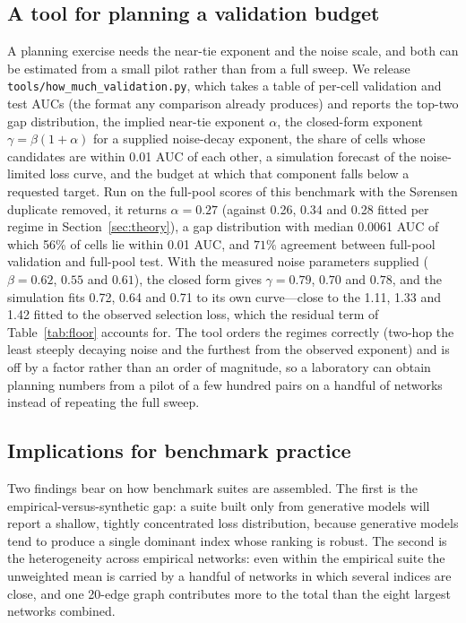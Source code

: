 \documentclass{comjnl}
\begin{document}
\subsection{A tool for planning a validation budget}
\label{sec:tool}

A planning exercise needs the near-tie exponent and the noise scale, and both can be estimated from a small pilot rather than from a full sweep. We release \texttt{tools/how\_much\_validation.py}, which takes a table of per-cell validation and test AUCs (the format any comparison already produces) and reports the top-two gap distribution, the implied near-tie exponent $\alpha$, the closed-form exponent $\gamma=\beta(1+\alpha)$ for a supplied noise-decay exponent, the share of cells whose candidates are within 0.01 AUC of each other, a simulation forecast of the noise-limited loss curve, and the budget at which that component falls below a requested target. Run on the full-pool scores of this benchmark with the S{\o}rensen duplicate removed, it returns $\alpha=0.27$ (against 0.26, 0.34 and 0.28 fitted per regime in Section~\ref{sec:theory}), a gap distribution with median 0.0061 AUC of which 56\% of cells lie within 0.01 AUC, and $71\%$ agreement between full-pool validation and full-pool test. With the measured noise parameters supplied ($\beta=0.62$, $0.55$ and $0.61$), the closed form gives $\gamma=0.79$, $0.70$ and $0.78$, and the simulation fits 0.72, 0.64 and 0.71 to its own curve---close to the 1.11, 1.33 and 1.42 fitted to the observed selection loss, which the residual term of Table~\ref{tab:floor} accounts for. The tool orders the regimes correctly (two-hop the least steeply decaying noise and the furthest from the observed exponent) and is off by a factor rather than an order of magnitude, so a laboratory can obtain planning numbers from a pilot of a few hundred pairs on a handful of networks instead of repeating the full sweep.

\subsection{Implications for benchmark practice}

Two findings bear on how benchmark suites are assembled. The first is the empirical-versus-synthetic gap: a suite built only from generative models will report a shallow, tightly concentrated loss distribution, because generative models tend to produce a single dominant index whose ranking is robust. The second is the heterogeneity across empirical networks: even within the empirical suite the unweighted mean is carried by a handful of networks in which several indices are close, and one 20-edge graph contributes more to the total than the eight largest networks combined.
\end{document}

